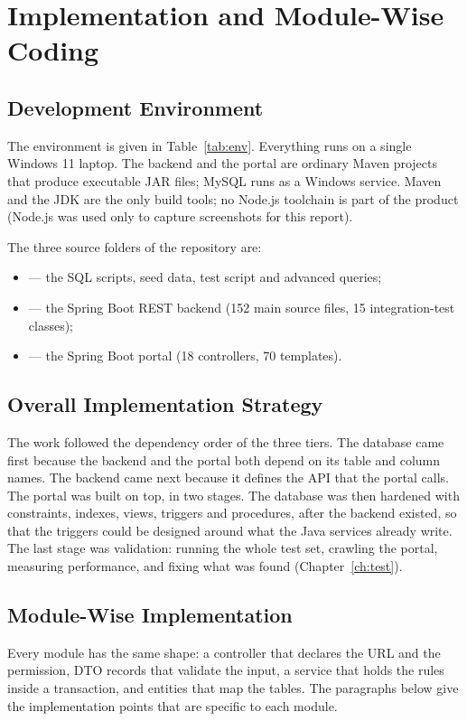\chapter{Implementation and Module-Wise Coding}\label{ch:impl}

\section{Development Environment}
The environment is given in Table~\ref{tab:env}. Everything runs on a single Windows 11
laptop. The backend and the portal are ordinary Maven projects that produce executable
JAR files; MySQL runs as a Windows service. Maven and the JDK are the only build tools; no
Node.js toolchain is part of the product (Node.js was used only to capture screenshots
for this report).

The three source folders of the repository are:
\begin{itemize}
\item {} --- the SQL scripts, seed data, test script and advanced queries;
\item {} --- the Spring Boot REST backend (152 main source files, 15 integration-test classes);
\item {} --- the Spring Boot portal (18 controllers, 70 templates).
\end{itemize}

\section{Overall Implementation Strategy}
The work followed the dependency order of the three tiers. The database came first
because the backend and the portal both depend on its table and column names. The backend
came next because it defines the API that the portal calls. The portal was built on top, in
two stages. The database was then hardened with constraints, indexes, views, triggers and
procedures, after the backend existed, so that the triggers could be designed around what
the Java services already write. The last stage was validation: running the whole test set,
crawling the portal, measuring performance, and fixing what was found
(Chapter~\ref{ch:test}).

\section{Module-Wise Implementation}
Every module has the same shape: a controller that declares the URL and the permission,
DTO records that validate the input, a service that holds the rules inside a transaction,
and entities that map the tables. The paragraphs below give the implementation points that
are specific to each module.

